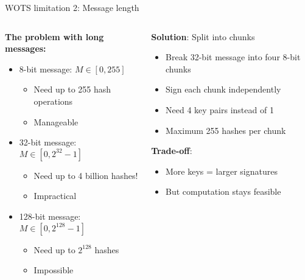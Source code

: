 \documentclass[aspectratio=169, lualatex, handout]{beamer}
\begin{document}
\begin{frame}{WOTS limitation 2: Message length}
	\begin{columns}[c]
		\begin{column}{0.55\textwidth}
			\textbf{The problem with long messages:}
			\begin{itemize}
				\item 8-bit message: $M \in [0, 255]$
				      \begin{itemize}
					      \item Need up to 255 hash operations
					      \item Manageable
				      \end{itemize}
				\item 32-bit message: $M \in [0, 2^{32}-1]$
				      \begin{itemize}
					      \item Need up to 4 billion hashes!
					      \item Impractical
				      \end{itemize}
				\item 128-bit message: $M \in [0, 2^{128}-1]$
				      \begin{itemize}
					      \item Need up to $2^{128}$ hashes
					      \item Impossible
				      \end{itemize}
			\end{itemize}
		\end{column}
		\begin{column}{0.45\textwidth}
			\textbf{Solution}: Split into chunks
			\begin{itemize}
				\item Break 32-bit message into four 8-bit chunks
				\item Sign each chunk independently
				\item Need 4 key pairs instead of 1
				\item Maximum 255 hashes per chunk
			\end{itemize}

			\textbf{Trade-off}:
			\begin{itemize}
				\item More keys = larger signatures
				\item But computation stays feasible
			\end{itemize}
		\end{column}
	\end{columns}
\end{frame}
\end{document}
